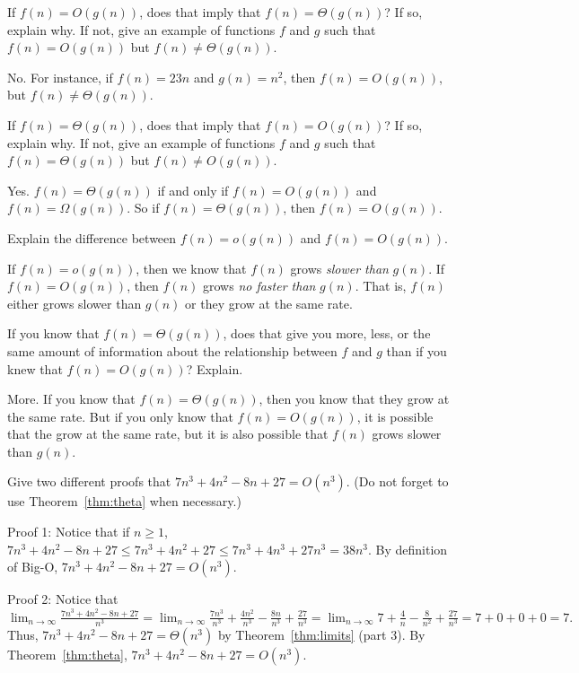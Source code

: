 \begin{requ}
If $f(n)=O(g(n))$, does that imply that $f(n)=\Theta(g(n))$? 
If so, explain why. 
If not, give an example of functions $f$ and $g$ such that $f(n)=O(g(n))$ but $f(n)\not=\Theta(g(n))$.
\begin{requanswer}
No. For instance, if $f(n)=23n$ and $g(n)=n^2$,  then $f(n)=O(g(n))$, but  $f(n)\not=\Theta(g(n))$.
\end{requanswer}
\end{requ}

\begin{requ}
If $f(n)=\Theta(g(n))$, does that imply that $f(n)=O(g(n))$? 
If so, explain why. 
If not, give an example of functions $f$ and $g$ such that $f(n)=\Theta(g(n))$ but $f(n)\not=O(g(n))$.
\begin{requanswer}
Yes. $f(n)=\Theta(g(n))$ if and only if $f(n)=O(g(n))$ and $f(n)=\Omega(g(n))$. 
So if $f(n)=\Theta(g(n))$, then $f(n)=O(g(n))$.
\end{requanswer}
\end{requ}

\begin{requ}
Explain the difference between $f(n)=o(g(n))$ and $f(n)=O(g(n))$.
\begin{requanswer}
If $f(n)=o(g(n))$, then we know that $f(n)$ grows {\em slower than} $g(n)$. 
If $f(n)=O(g(n))$, then $f(n)$ grows {\em no faster than} $g(n)$. 
That is, $f(n)$ either grows slower than $g(n)$ or they grow at the same rate.
\end{requanswer}
\end{requ}


\begin{requ}
If you know that $f(n)=\Theta(g(n))$, does that give you more, less, or the same amount of information about 
the relationship between $f$ and $g$ than if you knew that $f(n)=O(g(n))$? Explain.
\begin{requanswer}
More. If you know that $f(n)=\Theta(g(n))$, then you know that they grow at the same rate.
But if you only know that $f(n)=O(g(n))$, it is possible that the grow at the same rate, but it is also possible
that $f(n)$ grows slower than $g(n)$.
\end{requanswer}
\end{requ}

\begin{requ}
Give two different proofs that $7n^3+4n^2-8n+27=O(n^3)$.
(Do not forget to use Theorem~\ref{thm:theta} when necessary.)
\begin{requanswer}
Proof 1: 
Notice that if $n\geq 1$, $7n^3+4n^2-8n+27\leq 7n^3+4n^2+27 \leq 7n^3+4n^3+27n^3=38n^3$.
By definition of Big-O, $7n^3+4n^2-8n+27=O(n^3)$.

\noindent
Proof 2: Notice that
$\displaystyle \lim_{n\rightarrow\infty} \frac{7n^3+4n^2-8n+27}{n^3} = 
\lim_{n\rightarrow\infty} \frac{7n^3}{n^3}+\frac{4n^2}{n^3}-\frac{8n}{n^3}+\frac{27}{n^3}
=\lim_{n\rightarrow\infty} 7+\frac{4}{n}-\frac{8}{n^2}+\frac{27}{n^3}
=7+0+0+0=7.$
Thus, $7n^3+4n^2-8n+27=\Theta(n^3)$ by Theorem~\ref{thm:limits} (part 3).
By Theorem~\ref{thm:theta}, $7n^3+4n^2-8n+27=O(n^3)$.
\end{requanswer}
\end{requ}

